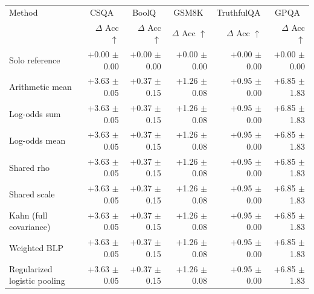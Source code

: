 \begin{tabular}{lrrrrr}
\toprule
Method & \multicolumn{1}{c}{CSQA} & \multicolumn{1}{c}{BoolQ} & \multicolumn{1}{c}{GSM8K} & \multicolumn{1}{c}{TruthfulQA} & \multicolumn{1}{c}{GPQA} \\
 & $\Delta$ Acc $\uparrow$ & $\Delta$ Acc $\uparrow$ & $\Delta$ Acc $\uparrow$ & $\Delta$ Acc $\uparrow$ & $\Delta$ Acc $\uparrow$ \\
\midrule
Solo reference & +0.00 {\scriptsize $\pm$ 0.00} & +0.00 {\scriptsize $\pm$ 0.00} & +0.00 {\scriptsize $\pm$ 0.00} & +0.00 {\scriptsize $\pm$ 0.00} & +0.00 {\scriptsize $\pm$ 0.00} \\
Arithmetic mean & +3.63 {\scriptsize $\pm$ 0.05} & +0.37 {\scriptsize $\pm$ 0.15} & +1.26 {\scriptsize $\pm$ 0.08} & +0.95 {\scriptsize $\pm$ 0.00} & +6.85 {\scriptsize $\pm$ 1.83} \\
Log-odds sum & +3.63 {\scriptsize $\pm$ 0.05} & +0.37 {\scriptsize $\pm$ 0.15} & +1.26 {\scriptsize $\pm$ 0.08} & +0.95 {\scriptsize $\pm$ 0.00} & +6.85 {\scriptsize $\pm$ 1.83} \\
Log-odds mean & +3.63 {\scriptsize $\pm$ 0.05} & +0.37 {\scriptsize $\pm$ 0.15} & +1.26 {\scriptsize $\pm$ 0.08} & +0.95 {\scriptsize $\pm$ 0.00} & +6.85 {\scriptsize $\pm$ 1.83} \\
Shared rho & +3.63 {\scriptsize $\pm$ 0.05} & +0.37 {\scriptsize $\pm$ 0.15} & +1.26 {\scriptsize $\pm$ 0.08} & +0.95 {\scriptsize $\pm$ 0.00} & +6.85 {\scriptsize $\pm$ 1.83} \\
Shared scale & +3.63 {\scriptsize $\pm$ 0.05} & +0.37 {\scriptsize $\pm$ 0.15} & +1.26 {\scriptsize $\pm$ 0.08} & +0.95 {\scriptsize $\pm$ 0.00} & +6.85 {\scriptsize $\pm$ 1.83} \\
Kahn (full covariance) & +3.63 {\scriptsize $\pm$ 0.05} & +0.37 {\scriptsize $\pm$ 0.15} & +1.26 {\scriptsize $\pm$ 0.08} & +0.95 {\scriptsize $\pm$ 0.00} & +6.85 {\scriptsize $\pm$ 1.83} \\
Weighted BLP & +3.63 {\scriptsize $\pm$ 0.05} & +0.37 {\scriptsize $\pm$ 0.15} & +1.26 {\scriptsize $\pm$ 0.08} & +0.95 {\scriptsize $\pm$ 0.00} & +6.85 {\scriptsize $\pm$ 1.83} \\
Regularized logistic pooling & +3.63 {\scriptsize $\pm$ 0.05} & +0.37 {\scriptsize $\pm$ 0.15} & +1.26 {\scriptsize $\pm$ 0.08} & +0.95 {\scriptsize $\pm$ 0.00} & +6.85 {\scriptsize $\pm$ 1.83} \\

\end{tabular}
